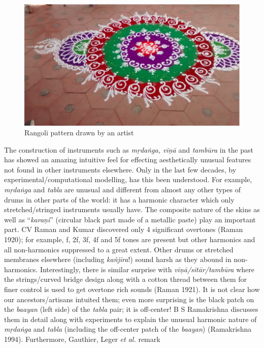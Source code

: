 \begin{figure}[tph]
\centering
\includegraphics[scale=.75]{figures/8.eps}
\caption{Rangoli pattern drawn by an artist}\label{chap3-fig6}
\end{figure}


The construction of instruments such as \textsl{mṛdaṅga, vīṇā} and \textsl{tambūra} in the past has showed an amazing intuitive feel for effecting aesthetically unusual features not found in other instruments elsewhere. Only in the last few decades, by experimental/computational modelling, has this been understood. For example, \textsl{mṛdaṅga} and \textsl{tabla} are unusual and different from almost any other types of drums in other parts of the world: it has a harmonic character which only stretched/\-stringed instruments usually have. The composite nature of the skins as well as “\textsl{karaṇi}” (circular black part made of a metallic paste) play an important part.  CV Raman and Kumar discovered only 4 significant overtones (Raman 1920); for example, f, 2f, 3f, 4f and 5f tones are present but other harmonics and all non-harmonics suppressed to a great extent. Other drums or stretched membranes elsewhere (including \textsl{kañjīra}!) sound harsh as they abound in non-harmonics. Interestingly, there is similar surprise with \textsl{vīṇā/sitār/tambūra} where the strings/curved bridge design along with a cotton thread between them for finer control is used to get overtone rich sounds (Raman 1921). It is not clear how our ancestors/artisans intuited them; even more surprising is the black patch on the \textsl{baayan} (left side) of the \textsl{tabla} pair; it is off-center! B S Ramakrishna discusses them in detail along with experiments to explain the unusual harmonic nature of \textsl{mṛdaṅga} and \textsl{tabla} (including the off-center patch of the \textsl{baayan}) (Ramakrishna 1994). Furthermore, Gauthier, Leger \textsl{et al.} remark 

